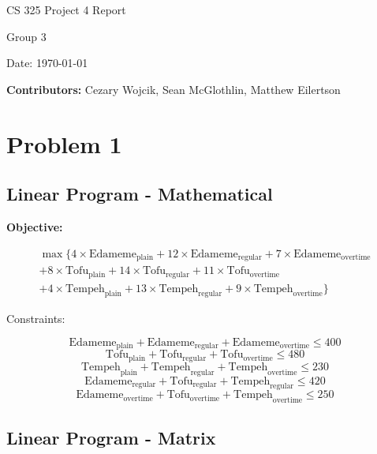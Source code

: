 \documentclass[12pt,letterpaper]{article}
\begin{document}
\begin{titlepage}
    \vspace*{4cm}
    {\huge \center
        CS 325 Project 4 Report\\[1cm]
    }
    \center
    {\large
        Group 3

        Date: \today

    \textbf{Contributors:}
    Cezary Wojcik,
    Sean McGlothlin,
    Matthew Eilertson
    }

\end{titlepage}

\section*{Problem 1}

\subsection*{Linear Program - Mathematical}

\textbf{Objective:}

\begin{eqnarray}
\max \{ 4 \times \mbox{Edameme}_{\mbox{plain}} + 12 \times \mbox{Edameme}_{\mbox{regular}} + 7 \times \mbox{Edameme}_{\mbox{overtime}} \nonumber \\
 + 8 \times \mbox{Tofu}_{\mbox{plain}} + 14 \times \mbox{Tofu}_{\mbox{regular}} + 11 \times \mbox{Tofu}_{\mbox{overtime}} \nonumber \\
 + 4 \times \mbox{Tempeh}_{\mbox{plain}} + 13 \times \mbox{Tempeh}_{\mbox{regular}} + 9 \times \mbox{Tempeh}_{\mbox{overtime}}  \} 
\end{eqnarray}

Constraints:

$$
\mbox{Edameme}_{\mbox{plain}} + \mbox{Edameme}_{\mbox{regular}} + \mbox{Edameme}_{\mbox{overtime}} \leq 400
$$
$$
\mbox{Tofu}_{\mbox{plain}} + \mbox{Tofu}_{\mbox{regular}} + \mbox{Tofu}_{\mbox{overtime}} \leq 480
$$
$$
\mbox{Tempeh}_{\mbox{plain}} + \mbox{Tempeh}_{\mbox{regular}} + \mbox{Tempeh}_{\mbox{overtime}} \leq 230
$$
$$
\mbox{Edameme}_{\mbox{regular}} + \mbox{Tofu}_{\mbox{regular}} + \mbox{Tempeh}_{\mbox{regular}} \leq 420
$$
$$
\mbox{Edameme}_{\mbox{overtime}} + \mbox{Tofu}_{\mbox{overtime}} + \mbox{Tempeh}_{\mbox{overtime}} \leq 250
$$

\subsection*{Linear Program - Matrix}
\end{document}
